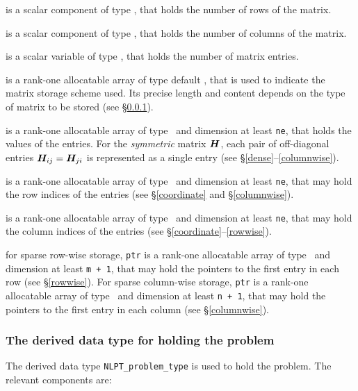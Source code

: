 \documentclass{galahad}
\begin{document}
\begin{description}

 is a scalar component of type \integer, 
that holds the number of rows of the matrix.

 is a scalar component of type \integer, 
that holds the number of columns of the matrix. 
 
 is a scalar variable of type \integer, that
holds the number of matrix entries.

 is a rank-one allocatable array of type default \character, that
is used to indicate the matrix storage scheme used. Its precise length and
content depends on the type of matrix to be stored (see \S\ref{typeprob}).

 is a rank-one allocatable array of type \realdp\,
and dimension at least {\tt ne}, that holds the values of the entries.
For the {\em symmetric} matrix ${\bm{H}}$, each pair of off-diagonal entries
${\bm{H}}_{ij} = {\bm{H}}_{ji}$ is represented
as a single entry (see \S\ref{dense}--\ref{columnwise}).

 is a rank-one allocatable array of type \integer\ 
and dimension at least {\tt ne}, that may hold the row indices of the entries 
(see \S\ref{coordinate} and \S\ref{columnwise}).

 is a rank-one allocatable array of type \integer\ 
and dimension at least {\tt ne}, that may hold the column indices of the entries
(see \S\ref{coordinate}--\ref{rowwise}).

 for sparse row-wise storage, {\tt ptr} is a rank-one
allocatable array of type \integer\ and dimension at least
{\tt m + 1}, that may hold the pointers to the first entry in each row
(see \S\ref{rowwise}).  For sparse column-wise storage, {\tt ptr}
is a rank-one allocatable array of type \integer\ and
dimension at least {\tt n + 1}, that may hold the pointers to the
first entry in each column (see \S\ref{columnwise}).

\end{description}


\subsubsection{The derived data type for holding the problem}\label{typeprob}
The derived data type {\tt NLPT\_problem\_type} is used to hold the
problem. The relevant components are:
\end{document}
